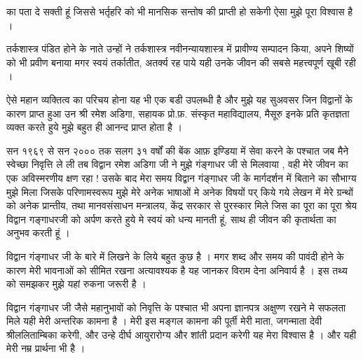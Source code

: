 का पता दे सक्ती हूं जिससे भर्तृहरि को भी मानसिक सन्तोष की प्राप्ती हो सकेगी ऐसा मुझे पूरा विश्वास है । 

तर्कशास्त्र पंडित होने के नाते उन्हों ने तर्कशास्त्र नवीनन्यायशास्त्र में प्रावीण्य सम्पादन किया, अपने शिष्यों को भी प्रवीण बनाया मगर स्वयं तर्कातीत, अतर्क्य रह पाये यही उनके जीवन की सबसे महत्त्वपूर्ण खूबी रही । 

ऐसे महान व्यक्तित्व का परिचय होना यह भी एक बडी उपलब्धी है और मुझे यह सुअवसर जिन विद्वानों के कारण प्राप्त हुआ उन श्री रमेश अडिगा, सहायक प्रो.फ़. संस्कृत महाविद्यालय, मैसूरु इनके प्रति कृतज्ञता व्यक्त करते हुये मुझे बहुत ही आनन्द प्राप्त होता है । 

सन १९६९ से सन २००० तक सलग ३१ वर्षों की बेंक आफ़ इण्डिया में सेवा करने के पश्चात जब मैने स्वेच्छा निवृत्ति ले ली तब विद्वान रमेश अडिगा जी ने मुझे गंङ्गाधर जी से मिलवाया , वही मेरे जीवन का एक अविस्मरणीय क्षण रहा ! उसके बाद मेरा समय विद्वान गंङ्गाधर जी के मार्गदर्शन में बिताने का सौभाग्य मुझे मिला जिसके परिणामस्वरूप मुझे मेरे अनेक भाषाओं मे अनेक विषयों पर् किये गये लेखन में मेरे ग्रन्थों को अनेक प्रान्तीय, तथा मानवसंसाधन मन्त्रालय, केंद्र सरकार से पुरस्कार मिले जिस का पूरा का पूरा श्रेय विद्वान गङ्गाधरजी को अर्पण करते हुये मे स्वयं को धन्य मानती हूं, साथ ही जीवन की कृतार्थता का   अनुभव करती हूं ।

विद्वान गंङ्गाधर जी के बारे में लिखने के लिये बहुत कुछ है ।  मगर शब्द और समय की पावंदी होने के कारण मेरी भावनाओं को सीमित रखना अत्यावश्यक है यह जानकर विराम देना अनिवार्य है । इस तथ्य को समझकर मुझे यहां रुकना जरूरी है । 

विद्वान गंङ्गाधर जी जैसे महानुभावों को निवृत्ति के पश्चात भी अपना ज्ञानपत्र अक्षुण्ण रखने मे सफलता मिले यही मेरी अन्तरिक कामना है । मेरी इस मङ्गल कामना की पूर्ती मेरी माता, जगन्माता देवी श्रीललिताम्बिका करेगी, और उन्हे दीर्घ आयुरारोग्य और शांती प्रदान करेगी यह मेरा विश्वास है । और यही मेरी नम्र प्रार्थना भी है ।

\articleend
